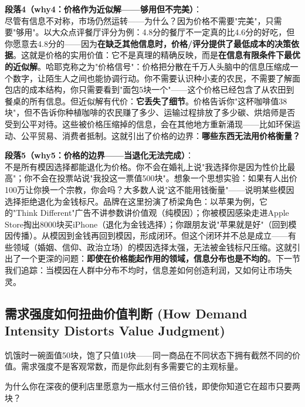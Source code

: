\documentclass[../main.tex]{subfiles}
\begin{document}
	\textbf{段落4（why4：价格作为近似解——够用但不完美）}：\\
	尽管有信息不对称，市场仍然运转——为什么？因为价格不需要"完美"，只需要"够用"。以大众点评餐厅评分为例：4.8分的餐厅不一定真的比4.6分的好吃，但你愿意去4.8分的——因为\textbf{在缺乏其他信息时，价格/评分提供了最低成本的决策依据}。这就是价格的实用价值：它不是真理的精确反映，而是\textbf{在信息有限条件下最优的近似解}。哈耶克称之为"价格信号"：价格把分散在千万人头脑中的信息压缩成一个数字，让陌生人之间也能协调行动。你不需要认识种小麦的农民，不需要了解面包店的成本结构，你只需要看到"面包5块一个"——这个价格已经包含了从农田到餐桌的所有信息。但近似解有代价：\textbf{它丢失了细节}。价格告诉你"这杯咖啡值38块"，但不告诉你种植咖啡的农民赚了多少、运输过程排放了多少碳、烘焙师是否受到公平对待。这些被价格压缩掉的信息，会在其他地方重新涌现——比如环保运动、公平贸易、消费者抵制。这就引出了价格的边界：\textbf{哪些东西无法用价格衡量？}

	\textbf{段落5（why5：价格的边界——当退化无法完成）}：\\
	不是所有模因选择都能退化为价格。你不会在婚礼上说"我选择你是因为性价比最高"；你不会在投票站说"我投这一票值500块"。想象一个思想实验：如果有人出价100万让你换一个宗教，你会吗？大多数人说"这不能用钱衡量"——说明某些模因选择拒绝退化为金钱标尺。品牌在这里扮演了桥梁角色：以苹果为例，它的"Think Different"广告不讲参数讲价值观（纯模因）；你被模因感染走进Apple Store掏出8000块买iPhone（退化为金钱选择）；你跟朋友说"苹果就是好"（回到模因传播）。从模因到金钱再回到模因，形成闭环。但这个闭环并不总是成立——有些领域（婚姻、信仰、政治立场）的模因选择太强，无法被金钱标尺压缩。这就引出了一个更深的问题：\textbf{即使在价格能起作用的领域，信息分布也是不均的}。下一节我们追踪：当模因在人群中分布不均时，信息差如何创造利润，又如何让市场失灵。

	\subsection{需求强度如何扭曲价值判断 (How Demand Intensity Distorts Value Judgment)}
	\begin{motivation}
		饥饿时一碗面值50块，饱了只值10块——同一商品在不同状态下拥有截然不同的价值。需求强度不是客观常数，而是你此刻有多需要它的主观标量。
	\end{motivation}
	\begin{questionbox}
		为什么你在深夜的便利店里愿意为一瓶水付三倍价钱，即使你知道它在超市只要两块？
	\end{questionbox}
\end{document}
